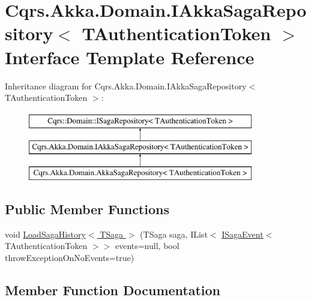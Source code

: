 \hypertarget{interfaceCqrs_1_1Akka_1_1Domain_1_1IAkkaSagaRepository}{}\section{Cqrs.\+Akka.\+Domain.\+I\+Akka\+Saga\+Repository$<$ T\+Authentication\+Token $>$ Interface Template Reference}
\label{interfaceCqrs_1_1Akka_1_1Domain_1_1IAkkaSagaRepository}
Inheritance diagram for Cqrs.\+Akka.\+Domain.\+I\+Akka\+Saga\+Repository$<$ T\+Authentication\+Token $>$\+:\begin{figure}[H]
\begin{center}
\leavevmode
\includegraphics[height=3.000000cm]{interfaceCqrs_1_1Akka_1_1Domain_1_1IAkkaSagaRepository}
\end{center}
\end{figure}
\subsection*{Public Member Functions}
\begin{DoxyCompactItemize}
\item 
void \hyperlink{interfaceCqrs_1_1Akka_1_1Domain_1_1IAkkaSagaRepository_a77233d8c2230c0a69a993faaac0101a9}{Load\+Saga\+History$<$ T\+Saga $>$} (T\+Saga saga, I\+List$<$ \hyperlink{interfaceCqrs_1_1Events_1_1ISagaEvent}{I\+Saga\+Event}$<$ T\+Authentication\+Token $>$$>$ events=null, bool throw\+Exception\+On\+No\+Events=true)
\end{DoxyCompactItemize}


\subsection{Member Function Documentation}
\mbox{\label{interfaceCqrs_1_1Akka_1_1Domain_1_1IAkkaSagaRepository_a77233d8c2230c0a69a993faaac0101a9}} 
